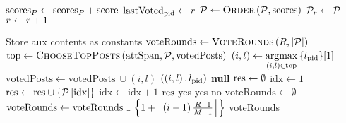 \documentclass[a4paper,english,cleveref, autoref]{oasics-v2019}
\begin{document}
\begin{subappendices}
\begin{algorithm}[H]
\begin{algorithmic}[1]
        \EndIf
        \label{alg:steem:handlevote:cost:end}
        \State $\mathrm{scores}_\post \gets \mathrm{scores}_\post +
        \mathrm{score}$
      \EndIf
      \State $\mathrm{lastVoted}_{\pid} \gets \round$
    \EndIf
      \State $\postlist \gets \textsc{Order}\left(\postlist,
      \mathrm{scores}\right)$ 
      \label{alg:steem:handlevote:order}
      \State $\postlist_r \gets \postlist$ 
      \State $\round \gets \round + 1$
    \EndIf
  \end{algorithmic}
\end{algorithm}
\begin{algorithm}[H]
  \caption{$\textsc{Vote}\left(\postlist, \mathrm{aux}\right)$}
  \label{alg:steem:vote}
  \begin{algorithmic}[1]
    \State Store aux contents as constants
    \State $\mathrm{voteRounds} \gets \textsc{VoteRounds}\left(\rounds,
    |\postlist|\right)$
      \State $\mathrm{top} \gets \textsc{ChooseTopPosts}\left(\attspan,
      \postlist, \mathrm{votedPosts}\right)$
      \State $\left(i, l\right) \gets \argmax\limits_{\left(i,
      l\right) \in \mathrm{top}}{\lbrace l_{\pid} \rbrace}[1]$
      \State $\mathrm{votedPosts} \gets \mathrm{votedPosts} \: \cup \left(i,
      l\right)$
      \State \Return $\left(\left(i, l\right), l_{\pid}\right)$
    \Else
      \State \Return \textbf{null}
    \EndIf
    \State
      \State $\result \gets \emptyset$
      \State $\mathrm{idx} \gets 1$
          \State $\result \gets \result \cup \lbrace
          \postlist\left[\mathrm{idx}\right] \rbrace$
        \EndIf
        \State $\mathrm{idx} \gets \mathrm{idx} + 1$
      \EndWhile
      \State \Return $\result$
    \EndFunction
    \State
    \label{alg:steem:vote:votethisround}
      \If{$\rounds < \postlen$}
        \State \Return yes
        \State \Return yes
      \Else
        \State \Return no
      \EndIf
    \EndFunction
    \State
    \label{alg:steem:vote:voterounds:start}
      \State $\mathrm{voteRounds} \gets \emptyset$
        \State $\mathrm{voteRounds} \gets \mathrm{voteRounds} \cup \left\{1 +
        \floor*{\left(i - 1\right)\frac{\rounds - 1}{\postlen - 1}}\right\}$
      \EndFor
      \State \Return voteRounds
    \EndFunction
    \label{alg:steem:vote:voterounds:end}
  \end{algorithmic}
\end{algorithm}
\end{subappendices}

\end{document}
